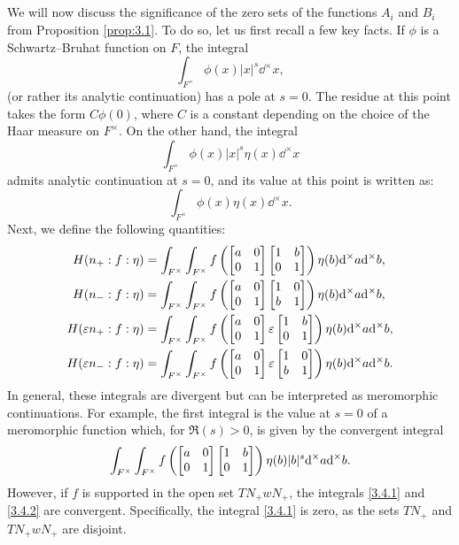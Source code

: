 \subsection{}
We will now discuss the significance of the zero sets of the functions $A_i$ and $B_i$ from Proposition \ref{prop:3.1}.
To do so, let us first recall a few key facts.
If $\phi$ is a Schwartz--Bruhat function on $F$, the integral
\[
\int_{F^\times} \phi(x) |x|^{s} \dd^\times x,
\]
(or rather its analytic continuation) has a pole at $s = 0$.
The residue at this point takes the form $C\phi(0)$, where $C$ is a constant depending on the choice of the Haar measure on $F^\times$.
On the other hand, the integral
\[
\int_{F^\times} \phi(x) |x|^{s} \eta(x) \dd^\times x
\]
admits analytic continuation at $s = 0$, and its value at this point is written as:
\[
\int_{F^\times} \phi(x) \eta(x) \dd^\times x.
\]
Next, we define the following quantities:
\begin{align}
    H(n_+: f: \eta) &= \int_{F^\times}\int_{F^\times} f \left( \begin{bmatrix} a & 0 \\ 0 & 1 \end{bmatrix} \begin{bmatrix} 1 & b \\ 0 & 1 \end{bmatrix} \right) \eta(b) \mathrm{d}^\times a \mathrm{d}^\times b, \label{3.4.1} \\
    H(n_-: f: \eta) &= \int_{F^\times}\int_{F^\times} f \left( \begin{bmatrix} a & 0 \\ 0 & 1 \end{bmatrix} \begin{bmatrix} 1 & 0 \\ b & 1 \end{bmatrix} \right) \eta(b) \mathrm{d}^\times a \mathrm{d}^\times b, \label{3.4.2} \\
    H(\varepsilon n_+: f: \eta) &= \int_{F^\times}\int_{F^\times} f \left( \begin{bmatrix} a & 0 \\ 0 & 1 \end{bmatrix} \varepsilon \begin{bmatrix} 1 & b \\ 0 & 1 \end{bmatrix} \right) \eta(b) \mathrm{d}^\times a \mathrm{d}^\times b, \label{3.4.3} \\
    H(\varepsilon n_-: f: \eta) &= \int_{F^\times}\int_{F^\times} f \left( \begin{bmatrix} a & 0 \\ 0 & 1 \end{bmatrix} \varepsilon \begin{bmatrix} 1 & 0 \\ b & 1 \end{bmatrix} \right) \eta(b) \mathrm{d}^\times a \mathrm{d}^\times b. \label{3.4.4}
\end{align}
In general, these integrals are divergent but can be interpreted as meromorphic continuations.
For example, the first integral is the value at $s = 0$ of a meromorphic function which, for $\Re(s) > 0$, is given by the convergent integral
\begin{align}
    \int_{F^\times} \int_{F^\times} f\left( \begin{bmatrix} a & 0 \\ 0 & 1 \end{bmatrix} \begin{bmatrix} 1 & b \\ 0 & 1 \end{bmatrix} \right) \eta(b) |b|^{s} \mathrm{d}^\times a \mathrm{d}^\times b.
\end{align}
However, if $f$ is supported in the open set $TN_{+}wN_{+}$, the integrals \eqref{3.4.1} and \eqref{3.4.2} are convergent.
Specifically, the integral \eqref{3.4.1} is zero, as the sets $TN_{+}$ and $TN_{+}wN_{+}$ are disjoint.
